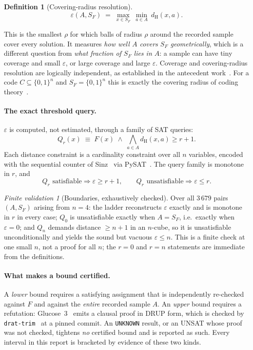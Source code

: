 \documentclass[11pt,a4paper]{article}
\theoremstyle{plain}
\theoremstyle{definition}
\newtheorem{definition}[theorem]{Definition}
\theoremstyle{remark}
\newtheorem{observation}[theorem]{Finite validation}
\newcommand{\dH}{d_{\mathrm{H}}}
\newcommand{\SF}{S_F}
\newcommand{\Qr}{Q_r}
\begin{document}
\begin{definition}[Covering-radius resolution]
\[
  \varepsilon(A,\SF) \;=\; \max_{x \in \SF}\ \min_{a \in A}\ \dH(x,a).
\]
\end{definition}

This is the smallest $\rho$ for which balls of radius $\rho$ around the recorded
sample cover every solution. It measures \emph{how well $A$ covers $\SF$
geometrically}, which is a different question from \emph{what fraction of $\SF$
lies in $A$}: a sample can have tiny coverage and small $\varepsilon$, or large
coverage and large $\varepsilon$. Coverage and covering-radius resolution are
logically independent, as established in the antecedent
work~\cite{dejesus2026sat}. For a code $C \subseteq \{0,1\}^n$ and
$\SF = \{0,1\}^n$ this is exactly the covering radius of coding
theory~\cite{cohen1997covering}.

\paragraph{The exact threshold query.}
$\varepsilon$ is computed, not estimated, through a family of SAT queries:
\begin{equation}\label{eq:query}
  \Qr(x) \;\equiv\; F(x) \;\wedge\; \bigwedge_{a \in A} \dH(x,a) \ge r+1 .
\end{equation}
Each distance constraint is a cardinality constraint over all $n$ variables,
encoded with the sequential counter of Sinz~\cite{sinz2005towards} via
PySAT~\cite{ignatiev2018pysat}. The query family is monotone in $r$, and
\[
  \Qr \text{ satisfiable} \Rightarrow \varepsilon \ge r+1,
  \qquad
  \Qr \text{ unsatisfiable} \Rightarrow \varepsilon \le r .
\]

\begin{observation}[Boundaries, exhaustively checked]\label{obs:oracle}
Over all $3\,679$ pairs $(A,\SF)$ arising from $n=4$: the ladder reconstructs
$\varepsilon$ exactly and is monotone in $r$ in every case; $Q_0$ is
unsatisfiable exactly when $A = \SF$, i.e.\ exactly when $\varepsilon = 0$; and
$Q_n$ demands distance $\ge n+1$ in an $n$-cube, so it is unsatisfiable
unconditionally and yields the sound but vacuous $\varepsilon \le n$. This is a
finite check at one small $n$, not a proof for all $n$; the $r=0$ and $r=n$
statements are immediate from the definitions.
\end{observation}

\paragraph{What makes a bound certified.}
A \emph{lower} bound requires a satisfying assignment that is independently
re-checked against $F$ and against the \emph{entire} recorded sample $A$. An
\emph{upper} bound requires a refutation: Glucose~3~\cite{audemard2009predicting}
emits a clausal proof in DRUP form, which is checked by
\texttt{drat-trim}~\cite{wetzler2014dratrim} at a pinned commit. An
\texttt{UNKNOWN} result, or an UNSAT whose proof was not checked, tightens
\emph{no} certified bound and is reported as such. Every interval in this report
is bracketed by evidence of these two kinds.
\end{document}
